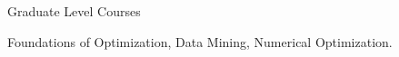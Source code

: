 \begin{rSection}{Graduate Level Courses}
  \iffalse
    ENGG5501: Foundations of Optimization \\ 
    ENGG5103: Data Mining \\
    SEEM5350: Numerical Optimization
  \fi
  Foundations of Optimization, Data Mining, Numerical Optimization. 
\end{rSection}
